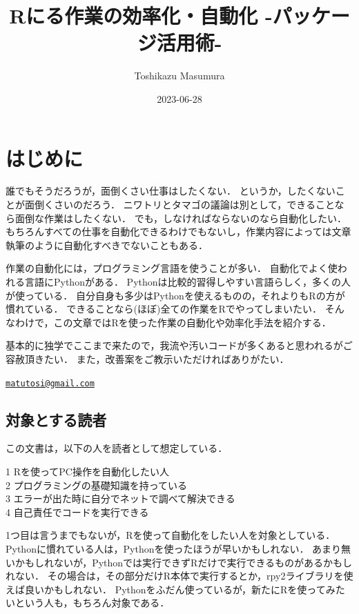 \documentclass[
]{article}
\title{Rにる作業の効率化・自動化 -パッケージ活用術-}
\author{Toshikazu Masumura}
\date{2023-06-28}
\begin{document}
\maketitle

{
\setcounter{tocdepth}{2}
\tableofcontents
}
\hypertarget{ux306fux3058ux3081ux306b}{%
\section*{はじめに}\label{ux306fux3058ux3081ux306b}}

誰でもそうだろうが，面倒くさい仕事はしたくない．
というか，したくないことが面倒くさいのだろう．
ニワトリとタマゴの議論は別として，できることなら面倒な作業はしたくない．
でも，しなければならないのなら自動化したい．
もちろんすべての仕事を自動化できるわけでもないし，作業内容によっては文章執筆のように自動化すべきでないこともある．

作業の自動化には，プログラミング言語を使うことが多い．
自動化でよく使われる言語にPythonがある．
Pythonは比較的習得しやすい言語らしく，多くの人が使っている．
自分自身も多少はPythonを使えるものの，それよりもRの方が慣れている．
できることなら(ほぼ)全ての作業をRでやってしまいたい．
そんなわけで，この文章ではRを使った作業の自動化や効率化手法を紹介する．

基本的に独学でここまで来たので，我流や汚いコードが多くあると思われるがご容赦頂きたい．
また，改善案をご教示いただければありがたい．

\href{mailto:matutosi@gmail.com}{\nolinkurl{matutosi@gmail.com}}

\hypertarget{ux5bfeux8c61ux3068ux3059ux308bux8aadux8005}{%
\subsection{対象とする読者}\label{ux5bfeux8c61ux3068ux3059ux308bux8aadux8005}}

この文書は，以下の人を読者として想定している．

1 Rを使ってPC操作を自動化したい人\\
2 プログラミングの基礎知識を持っている\\
3 エラーが出た時に自分でネットで調べて解決できる\\
4 自己責任でコードを実行できる

1つ目は言うまでもないが，Rを使って自動化をしたい人を対象としている．
Pythonに慣れている人は，Pythonを使ったほうが早いかもしれない．
あまり無いかもしれないが，Pythonでは実行できずRだけで実行できるものがあるかもしれない．
その場合は，その部分だけR本体で実行するとか，rpy2ライブラリを使えば良いかもしれない．
Pythonをふだん使っているが，新たにRを使ってみたいという人も，もちろん対象である．
\end{document}
